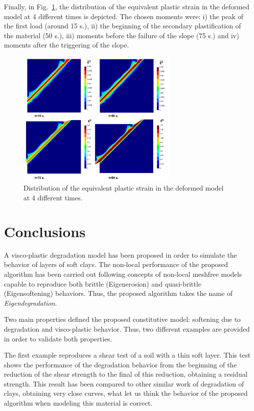 \documentclass[applsci,journal,article,submit,moreauthors,pdftex]{Definitions/mdpi}
\begin{document}
Finally, in Fig.~\ref{fig_VC4}, the distribution of the equivalent plastic strain in the deformed model at 4 different times is depicted. The chosen moments were: i) the peak of the first load (around 15 s.), ii) the beginning of the secondary plastification of the material (50 s.), iii) moments before the failure of the slope (75 s.) and iv) moments after the triggering of the slope. 

\begin{figure}
\includegraphics[width=0.7\textwidth]{Figs/EP_VC.pdf}
\caption{Distribution of the equivalent plastic strain in the deformed model at 4 different times.}
\label{fig_VC4}
\end{figure}

\section{Conclusions}

A visco-plastic degradation model has been proposed in order to simulate the behavior of layers of soft clays. The non-local performance of the proposed algorithm has been carried out following concepts of non-local meshfree models capable to reproduce both brittle (Eigenerosion) and quasi-brittle (Eigensoftening) behaviors. Thus, the proposed algorithm takes the name of \textit{Eigendegradation}.

Two main properties defined the proposed constitutive model: softening due to degradation and visco-plastic behavior. Thus, two different examples are provided in order to validate both properties.

The first example reproduces a shear test of a soil with a thin soft layer. This test shows the performance of the degradation behavior from the beginning of the reduction of the shear strength to the final of this reduction, obtaining a residual strength. This result has been compared to other similar work of degradation of clays, obtaining very close curves,  what let us think the behavior of the proposed algorithm when modeling this material is correct.
\end{document}
